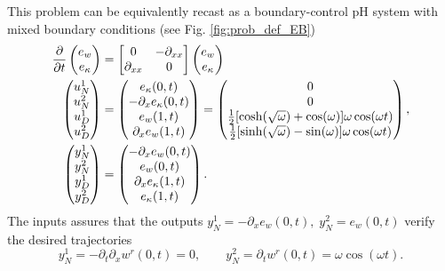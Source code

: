 This problem can be equivalently recast as a boundary-control pH system with mixed boundary conditions (see Fig. \ref{fig:prob_def_EB})
\begin{subequations}
	\begin{align}
	\diffp{}{t}\begin{pmatrix}
	e_w \\ e_\kappa \\
	\end{pmatrix} &= \begin{bmatrix}
	0 & -\partial_{xx} \\
	\partial_{xx} & 0 \\
	\end{bmatrix} \begin{pmatrix}
	e_w \\ e_\kappa \\
	\end{pmatrix}  \\
	\begin{pmatrix}
	u_N^1 \\
	u_N^2 \\
	u_D^1 \\
	u_D^2 \\
	\end{pmatrix} &= \begin{pmatrix}
	e_\kappa(0, t) \\
	-\partial_x e_\kappa(0, t) \\
	e_w(1, t) \\
	\partial_x e_w(1,t) \\
	\end{pmatrix} = \begin{pmatrix}
	0 \\
	0 \\
	\frac{1}{2}[\cosh(\sqrt{\omega}) + \cos(\omega)]\omega \cos(\omega t) \\
	\frac{1}{2}[\sinh(\sqrt{\omega}) - \sin(\omega)]\omega \cos(\omega t) \\
	\end{pmatrix},  \\
	\begin{pmatrix}
	y_N^1 \\
	y_N^2 \\
	y_D^1 \\
	y_D^2 \\
	\end{pmatrix}  &= \begin{pmatrix}
	-\partial_x e_w(0, t) \\
	e_w(0, t) \\
	\partial_x e_\kappa(1, t) \\
	e_\kappa(1,t) \\
	\end{pmatrix}.
	\end{align}
\end{subequations}
The inputs assures that the outputs $y_{N}^1 = -\partial_x e_w(0, t), \; y_{N}^2 = e_w(0, t)$ verify the desired trajectories
$$ y_{N}^1 =  -\partial_t \partial_x w^r(0,t) = 0, \qquad y_{N}^2 = \partial_t w^r(0, t) = \omega \cos(\omega t).
$$


